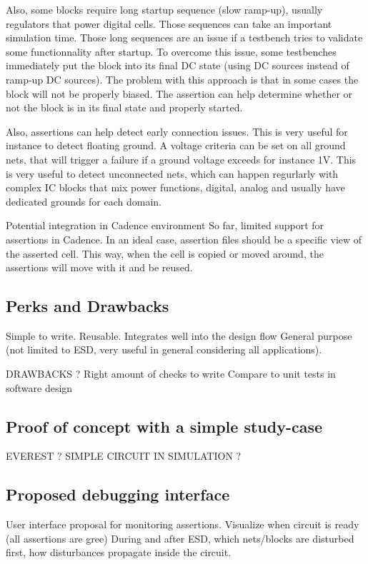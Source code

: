 Also, some blocks require long startup sequence (slow ramp-up), usually regulators that power digital cells.
Those sequences can take an important simulation time.
Those long sequences are an issue if a testbench tries to validate some functionnality after startup.
To overcome this issue, some testbenches immediately put the block into its final DC state (using DC sources instead of ramp-up DC sources).
The problem with this approach is that in some cases the block will not be properly biased.
The assertion can help determine whether or not the block is in its final state and properly started.

Also, assertions can help detect early connection issues.
This is very useful for instance to detect floating ground.
A voltage criteria can be set on all ground nets, that will trigger a failure if a ground voltage exceeds for instance 1V.
This is very useful to detect unconnected nets, which can happen regurlarly with complex IC blocks that mix power functions, digital, analog
and usually have dedicated grounds for each domain.

Potential integration in Cadence environment
So far, limited support for assertions in Cadence.
In an ideal case, assertion files should be a specific view of the asserted cell.
This way, when the cell is copied or moved around, the assertions will move with it and be reused.

\subsection{Perks and Drawbacks}

Simple to write.
Reusable.
Integrates well into the design flow
General purpose (not limited to ESD, very useful in general considering all applications).

DRAWBACKS ?
Right amount of checks to write
Compare to unit tests in software design

\subsection{Proof of concept with a simple study-case}

EVEREST ?
SIMPLE CIRCUIT IN SIMULATION ?

\subsection{Proposed debugging interface}

User interface proposal for monitoring assertions.
Visualize when circuit is ready (all assertions are gree)
During and after ESD, which nets/blocks are disturbed first, how disturbances propagate inside the circuit.
